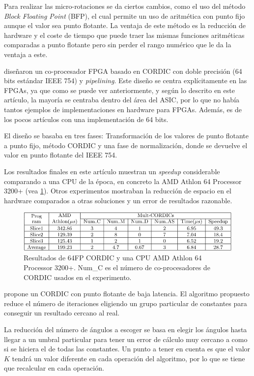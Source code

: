 Para realizar las micro-rotaciones se da ciertos cambios, como el uso del método \textit{Block Floating Point} (BFP), el cual permite un uso de aritmética con punto fijo aunque el valor sea punto flotante. La ventaja de este método es la reducción de hardware y el coste de tiempo que puede traer las mismas funciones aritméticas comparadas a punto flotante pero sin perder el rango numérico que le da la ventaja a este.

\cite{zhou_double_2008} diseñaron un co-procesador FPGA basado en CORDIC con doble precisión (64 bits estándar IEEE 754) y \textit{pipelining}. Este diseño se centra explícitamente en las FPGAs, ya que como se puede ver anteriormente, y según lo descrito en este artículo, la mayoría se centraba dentro del área del ASIC, por lo que no había tantos ejemplos de implementaciones en hardware para FPGAs. Además, es de los pocos artículos con una implementación de 64 bits.

El diseño se basaba en tres fases: Transformación de los valores de punto flotante a punto fijo, método CORDIC y una fase de normalización, donde se devuelve el valor en punto flotante del IEEE 754.

Los resultados finales en este artículo muestran un \textit{speedup} considerable comparando a una CPU de la época, en concreto la AMD Athlon 64 Processor 3200+ (vea \ref{graf:2008_64FP_results_AMD}). Otros experimentos mostraban la reducción de espacio en el hardware comparados a otras soluciones y un error de resultados razonable.

\begin{figure}[ht]
	\centering
	\includegraphics[width=\textwidth]{archivos/CORDIC/2008_64FP_results_AMD.png}
	\caption{Resultados de 64FP CORDIC y una CPU AMD Athlon 64 Processor 3200+. Num\_C es el número de co-procesadores de CORDIC usados en el experimento.}
	\label{graf:2008_64FP_results_AMD}
\end{figure}

\cite{nguyen_low-resource_2015} propone un CORDIC con punto flotante de baja latencia. El algoritmo propuesto reduce el número de iteraciones eligiendo un grupo particular de constantes para conseguir un resultado cercano al real.

La reducción del número de ángulos a escoger se basa en elegir los ángulos hasta llegar a un umbral particular para tener un error de cálculo muy cercano a como si se hiciera el de todas las constantes. Un punto a tener en cuenta es que el valor $K$ tendrá un valor diferente en cada operación del algoritmo, por lo que se tiene que recalcular en cada operación.

